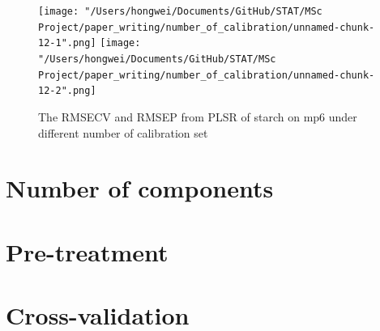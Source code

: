 \documentclass[a4paper,12pt,titlepage]{article} %
\numberwithin{equation}{section}  %
\begin{document}
\begin{appendices}
			\begin{figure}[h]    %
	\centering           %
	\texttt{[image: "/Users/hongwei/Documents/GitHub/STAT/MSc Project/paper\_writing/number\_of\_calibration/unnamed-chunk-12-1".png]}  %
	\texttt{[image: "/Users/hongwei/Documents/GitHub/STAT/MSc Project/paper\_writing/number\_of\_calibration/unnamed-chunk-12-2".png]}  %
	\caption{The RMSECV and RMSEP from PLSR of starch on mp6 under different number of calibration set}          %
	\label{fig:calibration_12-1}               %
\end{figure}                        %
		
		
		
		
		
		
		\clearpage
		\section{Number of components}
		
		\clearpage
		\section{Pre-treatment}
		
		\clearpage
		\section{Cross-validation}
		
	\end{appendices}
\end{document}
